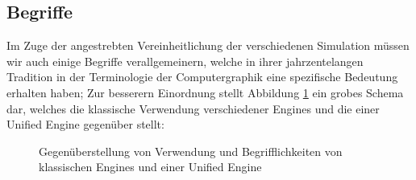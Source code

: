 	


\subsection{Begriffe}

Im Zuge der angestrebten Vereinheitlichung der  verschiedenen Simulation müssen wir auch einige Begriffe verallgemeinern, 
welche in ihrer jahrzentelangen Tradition in der Terminologie der Computergraphik eine spezifische Bedeutung erhalten haben;
Zur besserern Einordnung stellt Abbildung \ref{fig:classicalVsUnified} ein grobes Schema dar, welches die klassische Verwendung verschiedener Engines und die einer Unified Engine gegenüber stellt:



	\begin{figure}[ht]
		\def\svgwidth{\textwidth}
	    
		\caption{Gegenüberstellung von Verwendung und Begrifflichkeiten von klassischen Engines und einer Unified Engine}
		\label{fig:classicalVsUnified}
	\end{figure}
	





